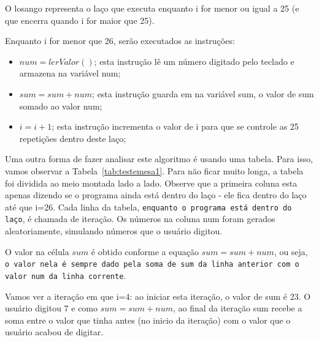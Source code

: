 O losango representa o laço que executa enquanto i for menor ou igual a 25 (e que encerra quando i for maior que 25). 

Enquanto i for menor que 26, serão executados as instruções:
\begin{itemize}
  \item $num = lerValor()$; esta instrução lê um número digitado pelo teclado e armazena na variável num;
  \item $sum = sum + num$; esta instrução guarda em na variável sum, o valor de sum somado ao valor num;
  \item $i = i + 1$; esta instrução incrementa o valor de i para que se controle as 25 repetições dentro deste laço;
\end{itemize}

Uma outra forma de fazer analisar este algoritmo é usando uma tabela. Para isso, vamos observar a Tabela~\ref{tab:testemesa1}. Para não ficar muito longa, a tabela foi dividida ao meio montada lado a lado. Observe que a primeira coluna esta apenas dizendo se o programa ainda está dentro do laço - ele fica dentro do laço até que i=26. Cada linha da tabela, \texttt{enquanto o programa está dentro do laço}, é chamada de iteração. Os números na coluna num foram gerados aleatoriamente, simulando números que o usuário digitou. 

O valor na célula $sum$ é obtido conforme a equação $sum = sum + num$, ou seja, \texttt{o valor nela é sempre dado pela soma de sum da linha anterior com o valor num da linha corrente}. 

Vamos ver a iteração em que i=4: ao iniciar esta iteração, o valor de sum é 23. O usuário digitou 7 e como $sum = sum + num$, ao final da iteração sum recebe a soma entre o valor que tinha antes (no inicio da iteração) com o valor que o usuário acabou de digitar.

